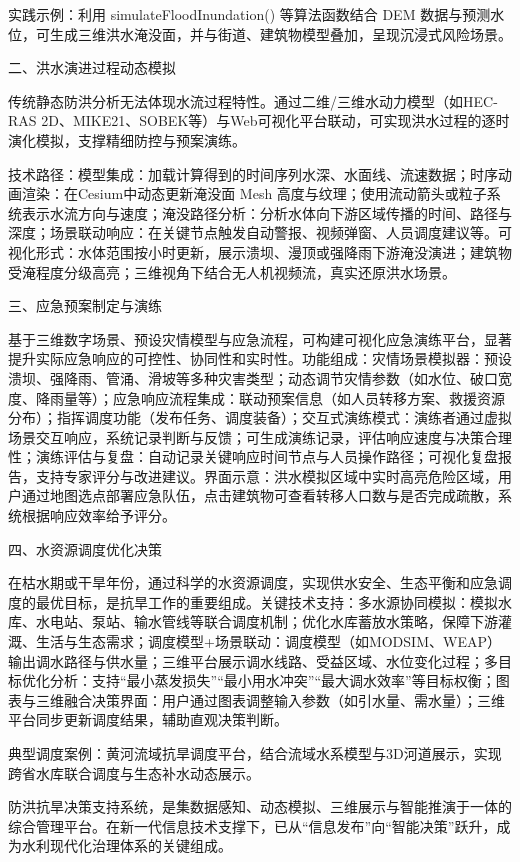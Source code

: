 实践示例：利用 simulateFloodInundation() 等算法函数结合 DEM 数据与预测水位，可生成三维洪水淹没面，并与街道、建筑物模型叠加，呈现沉浸式风险场景。

二、洪水演进过程动态模拟

传统静态防洪分析无法体现水流过程特性。通过二维/三维水动力模型（如HEC-RAS 2D、MIKE21、SOBEK等）与Web可视化平台联动，可实现洪水过程的逐时演化模拟，支撑精细防控与预案演练。

技术路径：模型集成：加载计算得到的时间序列水深、水面线、流速数据；时序动画渲染：在Cesium中动态更新淹没面 Mesh 高度与纹理；使用流动箭头或粒子系统表示水流方向与速度；淹没路径分析：分析水体向下游区域传播的时间、路径与深度；场景联动响应：在关键节点触发自动警报、视频弹窗、人员调度建议等。可视化形式：水体范围按小时更新，展示溃坝、漫顶或强降雨下游淹没演进；建筑物受淹程度分级高亮；三维视角下结合无人机视频流，真实还原洪水场景。

三、应急预案制定与演练

基于三维数字场景、预设灾情模型与应急流程，可构建可视化应急演练平台，显著提升实际应急响应的可控性、协同性和实时性。功能组成：灾情场景模拟器：预设溃坝、强降雨、管涌、滑坡等多种灾害类型；动态调节灾情参数（如水位、破口宽度、降雨量等）；应急响应流程集成：联动预案信息（如人员转移方案、救援资源分布）；指挥调度功能（发布任务、调度装备）；交互式演练模式：演练者通过虚拟场景交互响应，系统记录判断与反馈；可生成演练记录，评估响应速度与决策合理性；演练评估与复盘：自动记录关键响应时间节点与人员操作路径；可视化复盘报告，支持专家评分与改进建议。界面示意：洪水模拟区域中实时高亮危险区域，用户通过地图选点部署应急队伍，点击建筑物可查看转移人口数与是否完成疏散，系统根据响应效率给予评分。

四、水资源调度优化决策

在枯水期或干旱年份，通过科学的水资源调度，实现供水安全、生态平衡和应急调度的最优目标，是抗旱工作的重要组成。关键技术支持：多水源协同模拟：模拟水库、水电站、泵站、输水管线等联合调度机制；优化水库蓄放水策略，保障下游灌溉、生活与生态需求；调度模型+场景联动：调度模型（如MODSIM、WEAP）输出调水路径与供水量；三维平台展示调水线路、受益区域、水位变化过程；多目标优化分析：支持``最小蒸发损失''``最小用水冲突''``最大调水效率''等目标权衡；图表与三维融合决策界面：用户通过图表调整输入参数（如引水量、需水量）；三维平台同步更新调度结果，辅助直观决策判断。

典型调度案例：黄河流域抗旱调度平台，结合流域水系模型与3D河道展示，实现跨省水库联合调度与生态补水动态展示。

防洪抗旱决策支持系统，是集数据感知、动态模拟、三维展示与智能推演于一体的综合管理平台。在新一代信息技术支撑下，已从``信息发布''向``智能决策''跃升，成为水利现代化治理体系的关键组成。

